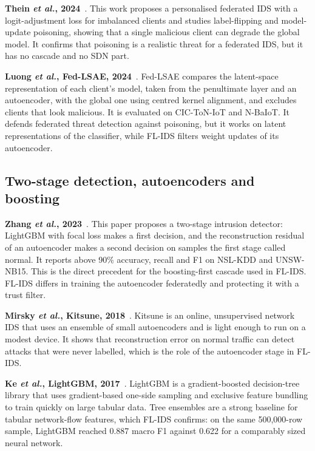 \textbf{Thein \emph{et al.}, 2024}~\cite{thein2024}. This work proposes a personalised federated IDS with a logit-adjustment loss for imbalanced clients and studies label-flipping and model-update poisoning, showing that a single malicious client can degrade the global model. It confirms that poisoning is a realistic threat for a federated IDS, but it has no cascade and no SDN part.

\textbf{Luong \emph{et al.}, Fed-LSAE, 2024}~\cite{luong2024}. Fed-LSAE compares the latent-space representation of each client's model, taken from the penultimate layer and an autoencoder, with the global one using centred kernel alignment, and excludes clients that look malicious. It is evaluated on CIC-ToN-IoT and N-BaIoT. It defends federated threat detection against poisoning, but it works on latent representations of the classifier, while FL-IDS filters weight updates of its autoencoder.

\subsection{Two-stage detection, autoencoders and boosting}

\textbf{Zhang \emph{et al.}, 2023}~\cite{zhang2023lgbmae}. This paper proposes a two-stage intrusion detector: LightGBM with focal loss makes a first decision, and the reconstruction residual of an autoencoder makes a second decision on samples the first stage called normal. It reports above 90\% accuracy, recall and F1 on NSL-KDD and UNSW-NB15. This is the direct precedent for the boosting-first cascade used in FL-IDS. FL-IDS differs in training the autoencoder federatedly and protecting it with a trust filter.

\textbf{Mirsky \emph{et al.}, Kitsune, 2018}~\cite{mirsky2018}. Kitsune is an online, unsupervised network IDS that uses an ensemble of small autoencoders and is light enough to run on a modest device. It shows that reconstruction error on normal traffic can detect attacks that were never labelled, which is the role of the autoencoder stage in FL-IDS.

\textbf{Ke \emph{et al.}, LightGBM, 2017}~\cite{ke2017lightgbm}. LightGBM is a gradient-boosted decision-tree library that uses gradient-based one-side sampling and exclusive feature bundling to train quickly on large tabular data. Tree ensembles are a strong baseline for tabular network-flow features, which FL-IDS confirms: on the same 500,000-row sample, LightGBM reached 0.887 macro F1 against 0.622 for a comparably sized neural network.

